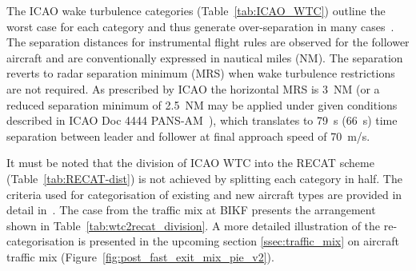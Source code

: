 The ICAO wake turbulence categories (Table~\ref{tab:ICAO_WTC}) outline the worst case for each category and thus generate over-separation in many cases~\cite{noauthor_recat_2018}. The separation distances for instrumental flight rules are observed for the follower aircraft and are conventionally expressed in nautical miles (NM). The separation reverts to radar separation minimum (MRS) when wake turbulence restrictions are not required. As  prescribed  by  ICAO  the  horizontal MRS is 3~NM (or a reduced separation minimum of 2.5~NM may be applied under given conditions described in ICAO Doc 4444 PANS-AM~\cite{doc44444}), which translates to 79~s (66~s) time separation between leader and follower at final approach speed of 70~m/s.


\begin{table}[h]
\centering
{}
\caption[ICAO wake turbulence categories and separation minima]{ICAO wake turbulence categories and separation minima to avoid wake vortex encounter~\cite{noauthor_recat_2018, rooseleer2015recat}.} \label{tab:ICAO_WTC}
\end{table}

It must be noted that the division of ICAO WTC into the RECAT scheme (Table~\ref{tab:RECAT-dist}) is not achieved by splitting each category in half.
The criteria used for categorisation of existing and new aircraft types are provided in detail in~\cite{rooseleer2015recat}. The case from the traffic mix at BIKF presents the arrangement shown in Table~\ref{tab:wtc2recat_division}. A more detailed illustration of the re-categorisation is presented in the upcoming section \ref{ssec:traffic_mix} on aircraft traffic mix (Figure~\ref{fig:post_fast_exit_mix_pie_v2}).

